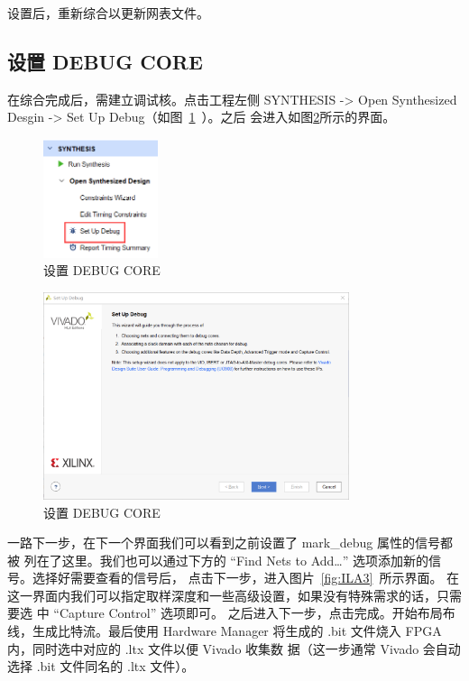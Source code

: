 \documentclass[ichigo,normal,cn]{elegantnote_mod}
\begin{document}
设置后，重新综合以更新网表文件。

\subsection{设置 DEBUG CORE}

在综合完成后，需建立调试核。点击工程左侧 SYNTHESIS -> Open 
Synthesized Desgin -> Set Up Debug（如图~\ref{fig:ILA1}~）。之后
会进入如图\ref{fig:ILA2}所示的界面。

\begin{figure}[!htbp]
    \centering
    \includegraphics[width=0.3\textwidth]{fig/ILA1}
    \caption{设置 DEBUG CORE}
    \label{fig:ILA1}
\end{figure}

\begin{figure}[!htbp]
    \centering
    \includegraphics[width=0.8\textwidth]{fig/ILA2}
    \caption{设置 DEBUG CORE}
    \label{fig:ILA2}
\end{figure}

一路下一步，在下一个界面我们可以看到之前设置了 mark\_debug 属性的信号都被
列在了这里。我们也可以通过下方的 “Find Nets to Add…” 选项添加新的信号。选择好需要查看的信号后，
点击下一步，进入图片~\ref{fig:ILA3}~所示界面。 在这一界面内我们可以指定取样深度和一些高级设置，如果没有特殊需求的话，只需要选
中 “Capture Control” 选项即可。 
 之后进入下一步，点击完成。开始布局布线，生成比特流。最后使用 Hardware 
Manager 将生成的 .bit 文件烧入 FPGA 内，同时选中对应的 .ltx 文件以便 Vivado 收集数
据（这一步通常 Vivado 会自动选择 .bit 文件同名的 .ltx 文件）。 
\end{document}
